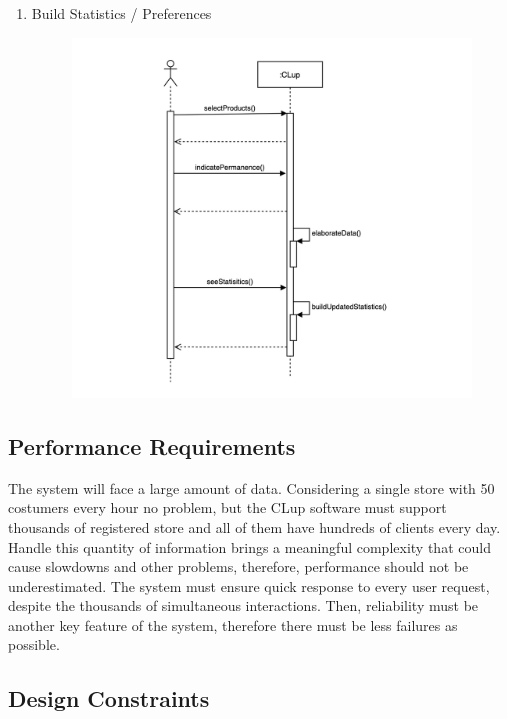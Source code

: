 \documentclass[]{article}
\begin{document}
\begin{enumerate}
						\item Build Statistics / Preferences
							\begin{figure}[H]
								\centering
								\includegraphics[width=\linewidth]{buildStats.png}
								\caption{}
								\label{fig:buildstats_sequencediagram}
							\end{figure}
						
						\end{enumerate}
		
		\subsection{Performance Requirements}
		
		The system will face a large amount of data. Considering a single store with 50 costumers every hour no problem, but the CLup software must support thousands of registered store and all of them have hundreds of clients every day. Handle this quantity of information brings a meaningful complexity that could cause slowdowns and other problems, therefore, performance should not be underestimated. The system must ensure quick response to every user request, despite the thousands of simultaneous interactions. 
		Then, reliability must be another key feature of the system, therefore there must be less failures as possible.
		
		\subsection{Design Constraints}
		
\end{document}
